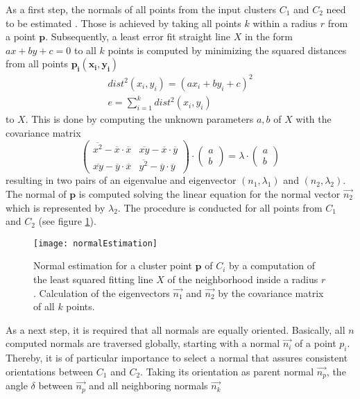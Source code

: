 As a first step, the normals of all points from the input clusters $C_1$ and $C_2$ need to be estimated \cite{normals}. Those is achieved by taking all points $k$ within a radius $r$ from a point $\boldsymbol{p}$. Subsequently, a least error fit straight line $X$ in the form $ax + by +c = 0$ to all $k$ points is computed by minimizing the squared distances from all points $\boldsymbol{p_i(x_i,y_i)}$
\begin{equation}
\begin{split}
dist^2(x_i, y_i) = (ax_i + by_i + c)^2
\\
e =   \displaystyle\sum_{i=1}^{k} dist^2(x_i, y_i)
\end{split}
\end{equation}
to $X$. This is done by computing the unknown parameters $a, b$ of $X$ with the covariance matrix 
\begin{equation}
\begin{pmatrix}
\overline{x^2} - \overline{x} \cdot \overline{x} & \overline{xy} -\overline{x} \cdot \overline{y}\\
\overline{xy} -\overline{y} \cdot \overline{x} & \overline{y^2} -\overline{y} \cdot \overline{y}
\end{pmatrix} \cdot \begin{pmatrix}
a \\
b
\end{pmatrix} = \lambda \cdot \begin{pmatrix}
a \\
b
\end{pmatrix}
\end{equation}
resulting in two pairs of an eigenvalue and eigenvector $(n_1,\lambda_1)$ and $(n_2,\lambda_2)$. The normal of $\boldsymbol{p}$ is computed solving the linear equation for the normal vector $\vec{n_2}$ which is represented by $\lambda_2$. The procedure is conducted for all points from $C_1$ and $C_2$ (see figure \ref{fig:normalEstimation}). 
\begin{figure}[H]
	\centering
	\texttt{[image: normalEstimation]}
	\caption{Normal estimation for a cluster point $\boldsymbol{p}$ of $C_i$ by a computation of the least squared fitting line $X$ of the neighborhood inside a radius $r$. Calculation of the eigenvectors $\vec{n_1}$ and $\vec{n_2}$ by the covariance matrix of all $k$ points.}
	\label{fig:normalEstimation}
\end{figure}
As a next step, it is required that all normals are equally oriented. Basically, all $n$ computed normals are traversed globally, starting with a normal $\vec{n_i}$ of a point $p_i$. Thereby, it is of particular importance to select a normal that assures consistent orientations between $C_1$ and $C_2$. Taking its orientation as parent normal $\vec{n_p}$, the angle $\delta$ between $\vec{n_p}$ and all neighboring normals $\vec{n_k}$ 
